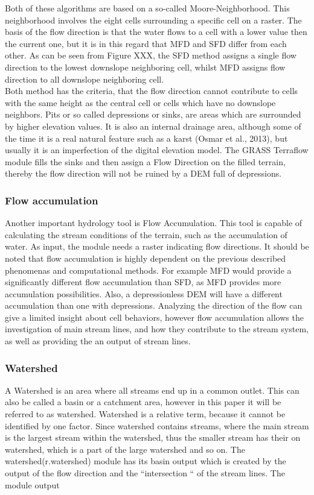 Both of these algorithms are based on a so-called Moore-Neighborhood. This neighborhood involves the eight cells surrounding a specific cell on a raster. The basis of the flow direction is that the water flows to a cell with a lower value then the current one, but it is in this regard that MFD and SFD differ from each other. As can be seen from Figure XXX, the SFD method assigns a single flow direction to the lowest downslope neighboring cell, whilst MFD assigns flow direction to all downslope neighboring cell. \\

Both method has the criteria, that the flow direction cannot contribute to cells with the same height as the central cell or cells which have no downslope neighbors.
Pits or so called depressions or sinks, are areas which are surrounded by higher elevation values. It is also an internal drainage area, although some of the time it is a real natural feature such as a karst (Osmar et al., 2013), but usually it is an imperfection of the digital elevation model.  The GRASS Terraflow module fills the sinks and then assign a Flow Direction on the filled terrain, thereby the flow direction will not be ruined by a DEM full of depressions. 

\subsubsection{Flow accumulation}
Another important hydrology tool is Flow Accumulation. This tool is capable of calculating the stream conditions of the terrain, such as the accumulation of water. As input, the module needs a raster indicating flow directions. It should be noted that flow accumulation is highly dependent on the previous described phenomenas and computational methods. For example MFD would provide a significantly different flow accumulation than SFD, as MFD provides more accumulation possibilities. Also, a depressionless DEM will have a different accumulation than one with depressions. Analyzing the direction of the flow can give a limited insight about cell behaviors, however flow accumulation allows the investigation of main stream lines, and how they contribute to the stream system, as well as providing the an output of stream lines.

\subsubsection{Watershed}
A Watershed is an area where all streams end up in a common outlet. This can also be called a basin or a catchment area, however in this paper it will be referred to as watershed.
Watershed is a relative term, because it cannot be identified by one factor. Since watershed contains streams, where the main stream is the largest stream within the watershed, thus the smaller stream has their on watershed, which is a part of the large watershed and so on. The watershed(r.watershed) module has its basin output which is created by the output of the flow direction and the “intersection “ of the stream lines. The module output

